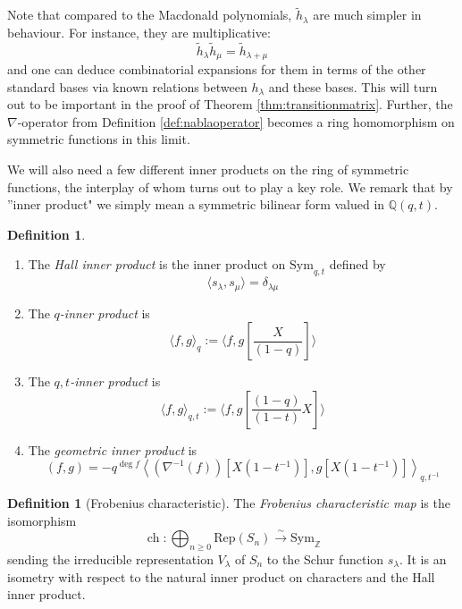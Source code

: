 \documentclass{amsart}
\numberwithin{equation}{section}
\theoremstyle{definition}
\newtheorem{definition}[lemma]{Definition}%
\def\tilde{\widetilde}
\def\Sym{{\mathrm{Sym}}}
\renewcommand{\th}{\tilde{h}}
\DeclareMathOperator{\ch}{\mathrm{ch}}
\newcommand{\Z}{{\mathbb Z}}
\newcommand{\Q}{{\mathbb Q}}
\newcommand{\F}{{\mathbb F}}
\begin{document}
Note that compared to the Macdonald polynomials, $\th_\lambda$ are much simpler in behaviour. For instance, they are multiplicative: $$\th_\lambda\th_\mu=\th_{\lambda+\mu}$$ and one can deduce combinatorial expansions for them in terms of the other standard bases via known relations between $h_\lambda$ and these bases. This will turn out to be important in the proof of Theorem \ref{thm:transitionmatrix}. Further, the $\nabla$-operator from Definition \ref{def:nablaoperator} becomes a ring homomorphism on symmetric functions in this limit.

We will also need a few different inner products on the ring of symmetric functions, the interplay of whom turns out to play a key role. We remark that by ''inner product" we simply mean a symmetric bilinear form
valued in $\Q(q,t)$.
\begin{definition}
\label{def:innerproducts}
\begin{enumerate}
\item The {\em Hall inner product} is the inner product on $\Sym_{q,t}$ defined by
$$\langle s_\lambda,s_\mu\rangle=\delta_{\lambda\mu}$$
\item The {\em $q$-inner product} is $$\langle f,g\rangle_q:=\langle f,g\left[\frac{X}{(1-q)}\right]\rangle$$
\item The {\em $q,t$-inner product} is $$\langle f,g\rangle_{q,t}:=\langle f,g\left[\frac{(1-q)}{(1-t)}X\right]\rangle$$
\item The {\em geometric inner product} is $$(f,g)=-q^{\deg f}\left\langle (\nabla^{-1}(f))[X(1-t^{-1})],g[X(1-t^{-1})] \right\rangle_{q,t^{-1}}$$
\end{enumerate}
\end{definition}
\begin{definition}[Frobenius characteristic]\label{def:frobenius}
The {\em Frobenius characteristic map} is the isomorphism $$\ch: \bigoplus_{n\geq 0}\text{Rep}(S_n)\xrightarrow{\sim} \Sym_\Z$$ sending the irreducible representation $V_\lambda$ of $S_n$ to the Schur function $s_\lambda$. It is an isometry with respect to the natural inner product on characters and the Hall inner product.
\end{definition}
%
\end{document}
